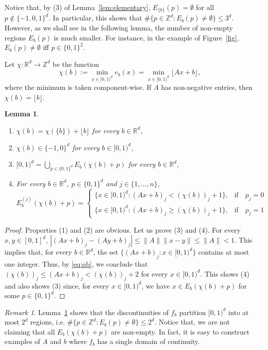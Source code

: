 \documentclass[12pt,reqno,a4paper]{amsart}%
\newtheorem{lemma}{Lemma}
\theoremstyle{definition}
\theoremstyle{remark}
\newtheorem{remark}{Remark}
\newcommand{\Rr}{\mathbb{R}}
\begin{document}
{{Notice that, by (3) of Lemma~\ref{lem:elementary}, $E_{\{b\}}(p)=\emptyset$ for all $p\notin\{-1,0,1\}^d$. In particular, this shows that $\#\{p\in\mathbb{Z}^d\colon E_b(p)\neq \emptyset\}\leq 3^d$. However, as we shall see in the following lemma, the number of non-empty regions $E_b(p)$ is much smaller. For instance, in the example of Figure~\ref{fig}, $E_b(p)\neq\emptyset$ iff  $p\in\{0,1\}^2$.   

Let $\chi\colon \Rr^d\to \mathbb{Z}^d$ be the function
\begin{equation}\label{eq:qb}
\chi(b) := \min_{x\in[0,1)^d} e_b(x) = \min_{x\in[0,1)^d} \lfloor Ax+b\rfloor,
\end{equation}
where the minimum is taken component-wise. If $A$ has non-negative entries, then $\chi(b)=\lfloor b\rfloor$.
\begin{lemma}\label{lem:chi}
\hfill
\begin{enumerate}
\item $\chi(b)=\chi(\{b\})+\lfloor b\rfloor$ for every $b\in\Rr^d$,
\item $\chi(b)\in\{-1,0\}^d$ for every $b\in[0,1)^d$,
\item $[0,1)^d = \bigcup_{p\in\{0,1\}^d} E_b(\chi(b)+p)$ for every $b\in\Rr^d$,
\item For every $b\in\Rr^d$, $p\in\{0,1\}^d$ and ${j\in\{1,\ldots,n\}}$,
$$
E_b^{{(j)}}(\chi(b)+p)=
\begin{cases}
\{x\in[0,1)^d\colon  (Ax+b)_{{j}}<(\chi(b))_{{j}}+1\},& {\textrm{if}}\quad p_j=0\\
\{x\in[0,1)^d\colon  (Ax+b)_{{j}}\geq (\chi(b))_{{j}}+1\},& {\textrm{if}}\quad p_j=1
\end{cases}
$$
\end{enumerate}
\end{lemma}

\begin{proof}Properties (1) and (2) are obvious. Let us prove (3) and (4).
For every $x,y\in[0,1]^d$, $|(Ax+b)_{{j}}-(Ay+b)_{{j}}|\leq \|A\|\|x-y\|\leq \|A\|<1$. This implies that, for every $b\in\Rr^d$, the set $\{(Ax+b)_{{j}}\colon x\in[0,1)^d \}$ contains at most one integer. Thus,  by \eqref{eq:qb}, we conclude that $(\chi(b))_{{j}} \leq (Ax+b)_{{j}} < (\chi(b))_{{j}} +2$ for every $x\in[0,1)^d$. This shows (4) and also shows (3) since, for every $x\in[0,1)^d$, we have $x\in E_b(\chi(b)+p)$ for some $p\in\{0,1\}^d$.
\end{proof}

\begin{remark}
Lemma~\ref{lem:chi} shows that the discontinuities of $f_b$ partition $[0,1)^d$ into at most $2^d$ regions, i.e. $\#\{p\in\mathbb{Z}^d\colon E_b(p)\neq \emptyset\}\leq 2^d$. Notice that, we are not claiming that all $E_b(\chi(b)+p)$ are non-empty. In fact, it is easy to construct examples of $A$ and $b$ where $f_b$ has a single domain of continuity.
\end{remark}

}}
\end{document}
